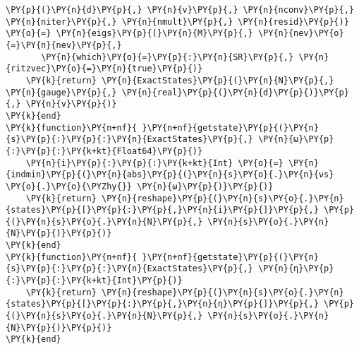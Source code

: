 \begin{Verbatim}[commandchars=\\\{\}]
    \PY{p}{(}\PY{n}{d}\PY{p}{,} \PY{n}{v}\PY{p}{,} \PY{n}{nconv}\PY{p}{,} \PY{n}{niter}\PY{p}{,} \PY{n}{nmult}\PY{p}{,} \PY{n}{resid}\PY{p}{)} \PY{o}{=} \PY{n}{eigs}\PY{p}{(}\PY{n}{M}\PY{p}{,} \PY{n}{nev}\PY{o}{=}\PY{n}{nev}\PY{p}{,}
       \PY{n}{which}\PY{o}{=}\PY{p}{:}\PY{n}{SR}\PY{p}{,} \PY{n}{ritzvec}\PY{o}{=}\PY{n}{true}\PY{p}{)}
    \PY{k}{return} \PY{n}{ExactStates}\PY{p}{(}\PY{n}{N}\PY{p}{,} \PY{n}{gauge}\PY{p}{,} \PY{n}{real}\PY{p}{(}\PY{n}{d}\PY{p}{)}\PY{p}{,} \PY{n}{v}\PY{p}{)}
\PY{k}{end}
\PY{k}{function}\PY{n+nf}{ }\PY{n+nf}{getstate}\PY{p}{(}\PY{n}{s}\PY{p}{:}\PY{p}{:}\PY{n}{ExactStates}\PY{p}{,} \PY{n}{ω}\PY{p}{:}\PY{p}{:}\PY{k+kt}{Float64}\PY{p}{)}
    \PY{n}{i}\PY{p}{:}\PY{p}{:}\PY{k+kt}{Int} \PY{o}{=} \PY{n}{indmin}\PY{p}{(}\PY{n}{abs}\PY{p}{(}\PY{n}{s}\PY{o}{.}\PY{n}{νs} \PY{o}{.}\PY{o}{\PYZhy{}} \PY{n}{ω}\PY{p}{)}\PY{p}{)}
    \PY{k}{return} \PY{n}{reshape}\PY{p}{(}\PY{n}{s}\PY{o}{.}\PY{n}{states}\PY{p}{[}\PY{p}{:}\PY{p}{,}\PY{n}{i}\PY{p}{]}\PY{p}{,} \PY{p}{(}\PY{n}{s}\PY{o}{.}\PY{n}{N}\PY{p}{,} \PY{n}{s}\PY{o}{.}\PY{n}{N}\PY{p}{)}\PY{p}{)}
\PY{k}{end}
\PY{k}{function}\PY{n+nf}{ }\PY{n+nf}{getstate}\PY{p}{(}\PY{n}{s}\PY{p}{:}\PY{p}{:}\PY{n}{ExactStates}\PY{p}{,} \PY{n}{η}\PY{p}{:}\PY{p}{:}\PY{k+kt}{Int}\PY{p}{)}
    \PY{k}{return} \PY{n}{reshape}\PY{p}{(}\PY{n}{s}\PY{o}{.}\PY{n}{states}\PY{p}{[}\PY{p}{:}\PY{p}{,}\PY{n}{η}\PY{p}{]}\PY{p}{,} \PY{p}{(}\PY{n}{s}\PY{o}{.}\PY{n}{N}\PY{p}{,} \PY{n}{s}\PY{o}{.}\PY{n}{N}\PY{p}{)}\PY{p}{)}
\PY{k}{end}


\end{Verbatim}
